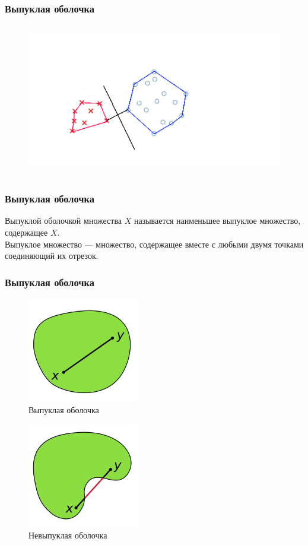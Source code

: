 \documentclass[12pt]{beamer}
\begin{document}
\begin{frame}\frametitle{Выпуклая оболочка}
\begin{figure}[htbp]
  \includegraphics[height=190pt, keepaspectratio = true]{images/example1}   
\end{figure}
\end{frame}

\begin{frame}\frametitle{Выпуклая оболочка}
Выпуклой оболочкой множества $X$ называется наименьшее выпуклое множество, содержащее $X$.\\
\vspace{5mm}
Выпуклое множество — множество, содержащее вместе с любыми двумя точками соединяющий их отрезок.
\end{frame}

\begin{frame}\frametitle{Выпуклая оболочка}
\begin{figure}[htbp]
	\begin{minipage}{.5\textwidth}
	  \includegraphics[height=130pt, keepaspectratio = true]{images/convex} \\
	  \centering Выпуклая оболочка
    \end{minipage}%
    \begin{minipage}{.5\textwidth}
		\includegraphics[height=130pt, keepaspectratio = true]{images/non-convex}   \\
		\centering Невыпуклая оболочка
	\end{minipage}%
\end{figure}
\end{frame}
\end{document}
